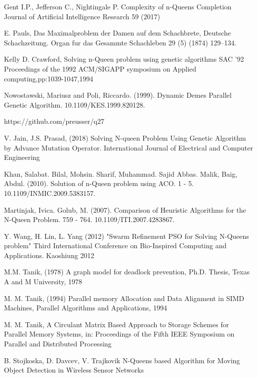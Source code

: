 \documentclass[conference]{IEEEtran}
\begin{document}
\begin{thebibliography}{99.}

 Gent I.P., Jefferson C., Nightingale P. 	Complexity of n-Queens Completion Journal of Artificial Intelligence Research 59 (2017) 

 E. Pauls, Das Maximalproblem der Damen auf dem Schachbrete, Deutsche Schachzeitung. Organ fur das Gesammte Schachleben 29 (5) (1874) 129–134.

 Kelly D. Crawford, Solving n-Queen problem using genetic algorithms SAC '92 Proceedings of the 1992 ACM/SIGAPP symposium on Applied computing,pp:1039-1047,1994 

 Nowostawski, Mariusz and Poli, Riccardo. (1999). Dynamic Demes Parallel Genetic Algorithm. 10.1109/KES.1999.820128. 

 https://github.com/preusser/q27

 V. Jain, J.S. Prasad, (2018) Solving N-queen Problem Using Genetic Algorithm by Advance Mutation Operator. International Journal of Electrical and Computer Engineering

 Khan, Salabat. Bilal, Mohsin. Sharif, Muhammad. Sajid Abbas. Malik, Baig, Abdul. (2010). Solution of n-Queen problem using ACO. 1 - 5. 10.1109/INMIC.2009.5383157. 

 Martinjak, Ivica. Golub, M. (2007). Comparison of Heuristic Algorithms for the N-Queen Problem. 759 - 764. 10.1109/ITI.2007.4283867.

  Y. Wang, H. Lin, L. Yang (2012) "Swarm Refinement PSO for Solving N-Queens problem" Third International Conference on Bio-Inspired Computing and Applications. Kaoshiung 2012

 M.M. Tanik, (1978) A graph model for deadlock prevention, Ph.D. Thesis, Texas A and M University, 1978

 M. M. Tanik, (1994) Parallel memory Allocation and Data Alignment in SIMD Machines, Parallel Algorithms and Applications, 1994

 M. M. Tanik, A Circulant Matrix Based Approach to Storage Schemes for Parallel Memory Systems,  in: Proceedings of the Fifth IEEE Symposium on Parallel and Distributed Processing

 B. Stojkoska, D. Davcev, V. Trajkovik N-Queens based Algorithm for Moving Object Detection in Wireless Sensor Networks


\end{thebibliography}
\end{document}

